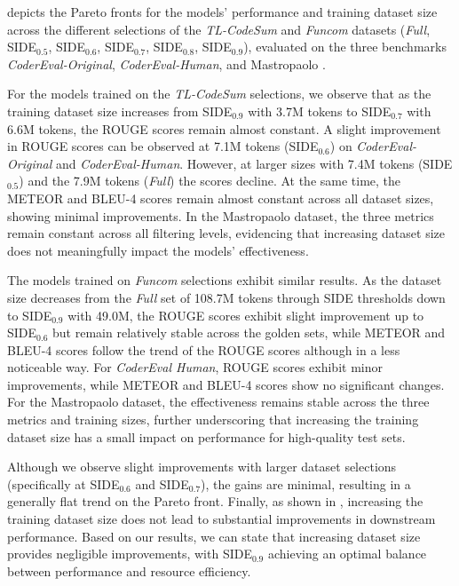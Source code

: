  depicts the Pareto fronts for the models' performance and training dataset size across the different selections of the \textit{TL-CodeSum} and \textit{Funcom} datasets (\ie \textit{Full}, SIDE$_{0.5}$, SIDE$_{0.6}$, SIDE$_{0.7}$, SIDE$_{0.8}$, SIDE$_{0.9}$), evaluated on the three benchmarks \ie \textit{CoderEval-Original}, \textit{CoderEval-Human}, and Mastropaolo \etal.

For the models trained on the \textit{TL-CodeSum} selections, we observe that as the training dataset size increases from SIDE$_{0.9}$ with 3.7M tokens to SIDE$_{0.7}$ with 6.6M tokens, the ROUGE scores remain almost constant. A slight improvement in ROUGE scores can be observed at 7.1M tokens (SIDE$_{0.6}$) on \textit{CoderEval-Original} and \textit{CoderEval-Human}. However, at larger sizes with 7.4M tokens (SIDE$_{0.5}$) and the 7.9M tokens (\textit{Full}) the scores decline. At the same time, the METEOR and BLEU-4 scores remain almost constant across all dataset sizes, showing minimal improvements. In the Mastropaolo \etal dataset, the three metrics remain constant across all filtering levels, evidencing that increasing dataset size does not meaningfully impact the models' effectiveness.

The models trained on \textit{Funcom} selections exhibit similar results. As the dataset size decreases from the \textit{Full} set of 108.7M tokens through SIDE thresholds down to SIDE$_{0.9}$ with 49.0M, the ROUGE scores exhibit slight improvement up to SIDE$_{0.6}$ but remain relatively stable across the golden sets, while METEOR and BLEU-4 scores follow the trend of the ROUGE scores although in a less noticeable way. For \textit{CoderEval Human}, ROUGE scores exhibit minor improvements, while METEOR and BLEU-4 scores show no significant changes. For the Mastropaolo \etal dataset, the effectiveness remains stable across the three metrics and training sizes, further underscoring that increasing the training dataset size has a small impact on performance for high-quality test sets.

Although we observe slight improvements with larger dataset selections (specifically at SIDE$_{0.6}$ and SIDE$_{0.7}$), the gains are minimal, resulting in a generally flat trend on the Pareto front. Finally, as shown in , increasing the training dataset size does not lead to substantial improvements in downstream performance.
Based on our results, we can state that increasing dataset size provides negligible improvements, with SIDE$_{0.9}$ achieving an optimal balance between performance and resource efficiency.

